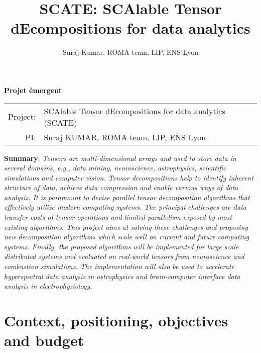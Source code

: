 \documentclass[a4paper,11pt]{article}
\title{SCATE: SCAlable Tensor dEcompositions for data analytics}
\author{Suraj Kumar, ROMA team, LIP, ENS Lyon}
\date{}
\author{}
\date{}
\begin{document}
	
	\begin{center}
		\Large\textbf{Projet émergent}
	\end{center}
	
	\begin{tabular}{rl}
		Project: & {\sc SCAlable Tensor dEcompositions for data analytics (SCATE)}\\
		PI: & Suraj KUMAR, ROMA team, LIP, ENS Lyon\\
	\end{tabular}\newline


	\textbf{Summary}: \emph{Tensors are multi-dimensional arrays and used to store data in several domains, e.g., data mining, neuroscience, astrophysics, scientific simulations and computer vision. Tensor decompositions help to identify inherent structure of data, achieve data compression and enable various ways of data analysis. It is paramount to devise parallel tensor decomposition algorithms that effectively utilize modern computing systems. The principal challenges are data transfer costs of tensor operations and limited parallelism exposed by most existing algorithms. This project aims at solving these challenges and proposing new decomposition algorithms which scale well on current and future computing systems. Finally, the proposed algorithms will be implemented for large scale distributed systems and evaluated on real-world tensors from neuroscience and combustion simulations. The implementation will also be used to accelerate hyperspectral data analysis in astrophysics and brain-computer interface data analysis in electrophysiology.}
	
	\vspace*{-0.35cm}\section*{Context, positioning, objectives and budget}\vspace*{-0.05cm}
	
\end{document}
